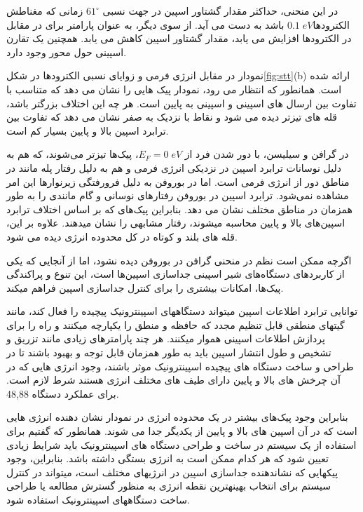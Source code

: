 در این منحنی، حداکثر مقدار گشتاور اسپین در جهت نسبی $61^\circ$ زمانی که مغناطش الکترودها$0.1\;eV$ باشد به دست می آید. از سوی دیگر، به عنوان پارامتر برای  در مقابل در الکترودها افزایش می یابد، مقدار گشتاور اسپین کاهش می یابد. همچنین یک تقارن اسپینی حول محور وجود دارد. 

نمودار  در مقابل انرژی فرمی و زوایای نسبی الکترودها در شکل\ref{fig:stt}(b) ارائه شده است. همانطور که انتظار می رود، نمودار پیک هایی را نشان می دهد که متناسب با تفاوت بین ارسال های اسپینی و اسپینی به پایین است. هر چه این اختلاف بزرگتر باشد، قله های تیزتر دیده می شود و نقاط با  نزدیک به صفر نشان می دهد که تفاوت بین ترابرد اسپین بالا و پایین بسیار کم است. 

در گرافن و سیلیسن، با دور شدن فرد از $E_F = 0\; eV$، پیک‌ها تیزتر می‌شوند، که هم به دلیل نوسانات ترابرد اسپین در نزدیکی انرژی فرمی و هم به دلیل رفتار پله مانند در مناطق دور از انرژی فرمی است. اما در بوروفن به دلیل فرورفتگی زیر‌نوارها این امر مشاهده نمی‌شود. ترابرد اسپین در بوروفن رفتارهای نوسانی و گام مانندی را به طور همزمان در مناطق مختلف نشان می دهد. بنابراین پیک‌های  که بر اساس اختلاف ترابرد اسپین‌های بالا و پایین محاسبه میشوند، رفتار مشابهی را نشان میدهند. علاوه بر این، قله های بلند و کوتاه در کل محدوده انرژی دیده می شود. 

اگرچه ممکن است نظم در منحنی  گرافن در بوروفن دیده نشود، اما از آنجایی که یکی از کاربردهای دستگاه‌های شیر اسپینی جداسازی اسپین‌ها است، این تنوع و پراکندگی پیک‌ها، امکانات بیشتری را برای کنترل جداسازی اسپین فراهم میکند. 

توانایی ترابرد اطلاعات اسپین میتواند دستگاههای اسپینترونیک پیچیده را فعال کند، مانند گیتهای منطقی قابل تنظیم مجدد که حافظه و منطق را یکپارچه میکنند و راه را برای پردازش اطلاعات اسپینی هموار میکنند. هر چند پارامترهای زیادی مانند تزریق و تشخیص و طول انتشار اسپین باید به طور همزمان قابل توجه و بهبود باشند تا در طراحی و ساخت دستگاه های پیچیده اسپینترونیک موثر باشند، وجود انرژی هایی که در آن چرخش های بالا و پایین دارای طیف های مختلف انرژی هستند شرط لازم است. برای عملکرد دستگاه 48,88. 

بنابراین وجود پیک‌های بیشتر در یک محدوده انرژی در نمودار  نشان دهنده انرژی هایی است که در آن اسپین های بالا و پایین از یکدیگر جدا می شوند. همانطور که گفتیم برای استفاده از یک سیستم در ساخت و طراحی دستگاه های اسپینترونیک باید شرایط زیادی تعیین شود که هر کدام ممکن است به انرژی بستگی داشته باشد. بنابراین، وجود پیکهایی که نشاندهنده جداسازی اسپین در انرژیهای مختلف است، میتواند در کنترل سیستم برای انتخاب بهینهترین نقطه انرژی به منظور گسترش مطالعه یا طراحی ساخت دستگاههای اسپینترونیک استفاده شود.

